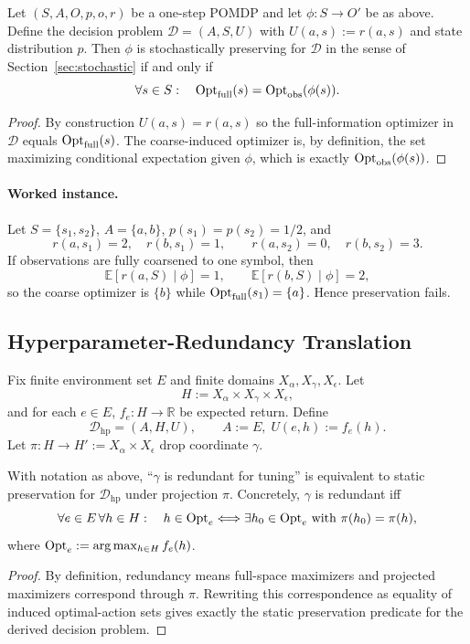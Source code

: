 \begin{proposition}\label{prop:pomdp-to-preservation}
Let $(S,A,O,p,o,r)$ be a one-step POMDP and let $\phi:S\to O'$ be as above. Define the decision problem $\mathcal{D}=(A,S,U)$ with $U(a,s):=r(a,s)$ and state distribution $p$. Then $\phi$ is stochastically preserving for $\mathcal{D}$ in the sense of Section~\ref{sec:stochastic} if and only if
\[
\forall s\in S:\quad \mathrm{Opt}_{\mathrm{full}}(s)=\mathrm{Opt}_{\mathrm{obs}}(\phi(s)).
\]
\end{proposition}

\begin{proof}
By construction $U(a,s)=r(a,s)$ so the full-information optimizer in $\mathcal{D}$ equals $\mathrm{Opt}_{\mathrm{full}}(s)$. The coarse-induced optimizer is, by definition, the set maximizing conditional expectation given $\phi$, which is exactly $\mathrm{Opt}_{\mathrm{obs}}(\phi(s))$.
\end{proof}

\paragraph{Worked instance.}
Let $S=\{s_1,s_2\}$, $A=\{a,b\}$, $p(s_1)=p(s_2)=1/2$, and
\[
r(a,s_1)=2,\quad r(b,s_1)=1,\qquad r(a,s_2)=0,\quad r(b,s_2)=3.
\]
If observations are fully coarsened to one symbol, then
\[
\mathbb{E}[r(a,S)\mid\phi]=1,\qquad \mathbb{E}[r(b,S)\mid\phi]=2,
\]
so the coarse optimizer is $\{b\}$ while $\mathrm{Opt}_{\mathrm{full}}(s_1)=\{a\}$. Hence preservation fails. 

\subsection{Hyperparameter-Redundancy Translation}

Fix finite environment set $E$ and finite domains $X_{\alpha},X_{\gamma},X_{\epsilon}$. Let
\[H:=X_{\alpha}\times X_{\gamma}\times X_{\epsilon},\]
and for each $e\in E$, $f_e:H\to\mathbb{R}$ be expected return. Define
\[\mathcal{D}_{\mathrm{hp}}=(A,H,U),\qquad A:=E,\; U(e,h):=f_e(h).\]
Let $\pi:H\to H':=X_{\alpha}\times X_{\epsilon}$ drop coordinate $\gamma$.

\begin{proposition}\label{prop:hp-to-static}
With notation as above, ``$\gamma$ is redundant for tuning'' is equivalent to static preservation for $\mathcal{D}_{\mathrm{hp}}$ under projection $\pi$. Concretely, $\gamma$ is redundant iff
\[
\forall e\in E\,\forall h\in H:\quad
h\in\mathrm{Opt}_e \Longleftrightarrow \exists h_0\in\mathrm{Opt}_e\text{ with }\pi(h_0)=\pi(h),
\]
where $\mathrm{Opt}_e:=\arg\max_{h\in H} f_e(h)$.
\end{proposition}

\begin{proof}
By definition, redundancy means full-space maximizers and projected maximizers correspond through $\pi$. Rewriting this correspondence as equality of induced optimal-action sets gives exactly the static preservation predicate for the derived decision problem.
\end{proof}
